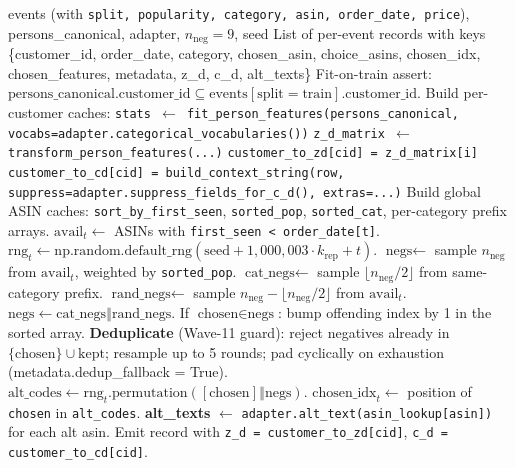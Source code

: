 \documentclass[11pt,a4paper]{article}
\begin{document}
\begin{algorithm}[H]
\caption{Per-event choice-set construction}
\label{alg:choice-sets}
\begin{algorithmic}[1]
\Require events (with \texttt{split, popularity, category, asin, order\_date, price}), persons\_canonical, adapter, $n_{\text{neg}} = 9$, seed
\Ensure List of per-event records with keys \{customer\_id, order\_date, category, chosen\_asin, choice\_asins, chosen\_idx, chosen\_features, metadata, z\_d, c\_d, alt\_texts\}
\State Fit-on-train assert: $\mathrm{persons\_canonical}.\mathrm{customer\_id} \subseteq \mathrm{events}[\mathrm{split}=\text{train}].\mathrm{customer\_id}$.
\State Build per-customer caches:
\State \quad \texttt{stats $\gets$ fit\_person\_features(persons\_canonical, vocabs=adapter.categorical\_vocabularies())}
\State \quad \texttt{z\_d\_matrix $\gets$ transform\_person\_features(...)}
\State \quad \texttt{customer\_to\_zd[cid] = z\_d\_matrix[i]}
\State \quad \texttt{customer\_to\_cd[cid] = build\_context\_string(row, suppress=adapter.suppress\_fields\_for\_c\_d(), extras=...)}
\State Build global ASIN caches: \texttt{sort\_by\_first\_seen}, \texttt{sorted\_pop}, \texttt{sorted\_cat}, per-category prefix arrays.
  \State $\text{avail}_t \gets$ ASINs with \texttt{first\_seen < order\_date[t]}.
  \State $\text{rng}_t \gets \mathrm{np.random.default\_rng}(\mathrm{seed} + 1{,}000{,}003 \cdot k_{\text{rep}} + t)$.
    \State $\text{negs} \gets$ sample $n_{\text{neg}}$ from $\text{avail}_t$, weighted by \texttt{sorted\_pop}.
  \Else
    \State $\text{cat\_negs} \gets$ sample $\lfloor n_{\text{neg}}/2 \rfloor$ from same-category prefix.
    \State $\text{rand\_negs} \gets$ sample $n_{\text{neg}} - \lfloor n_{\text{neg}}/2 \rfloor$ from $\text{avail}_t$.
    \State $\text{negs} \gets \text{cat\_negs} \mathbin\Vert \text{rand\_negs}$.
  \EndIf
  \State If $\text{chosen} \in \text{negs}$: bump offending index by 1 in the sorted array.
  \State \textbf{Deduplicate} (Wave-11 guard): reject negatives already in $\{\text{chosen}\} \cup \text{kept}$; resample up to 5 rounds; pad cyclically on exhaustion (metadata.dedup\_fallback = True).
  \State $\text{alt\_codes} \gets \text{rng}_t.\mathrm{permutation}([\text{chosen}] \mathbin\Vert \text{negs})$.
  \State $\text{chosen\_idx}_t \gets$ position of \texttt{chosen} in \texttt{alt\_codes}.
  \State \textbf{alt\_texts} $\gets$ \texttt{adapter.alt\_text(asin\_lookup[asin])} for each alt asin.
  \State Emit record with \texttt{z\_d = customer\_to\_zd[cid]}, \texttt{c\_d = customer\_to\_cd[cid]}.
\EndFor
\end{algorithmic}
\end{algorithm}
\end{document}
